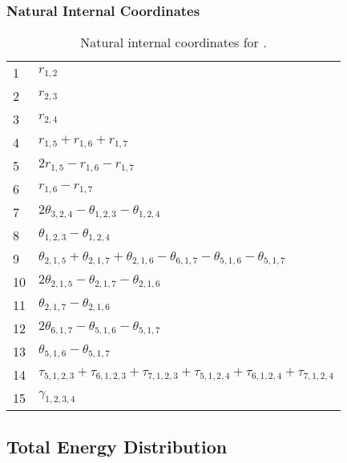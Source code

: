 \documentclass[10pt,oneside]{article}
\begin{document}
\begin{table}[h!]
\subsubsection*{Natural Internal Coordinates}
\centering
\caption{Natural internal coordinates for .}
\small
\begin{tabular}{ll}
\toprule
  1   & $r_{1,2}$ \\
  2   & $r_{2,3}$ \\
  3   & $r_{2,4}$ \\
  4   & $r_{1,5} + r_{1,6} + r_{1,7}$ \\
  5   & $2r_{1,5} - r_{1,6} - r_{1,7}$ \\
  6   & $r_{1,6} - r_{1,7}$ \\
  7   & $2\theta_{3,2,4} - \theta_{1,2,3} - \theta_{1,2,4}$ \\
  8   & $\theta_{1,2,3} - \theta_{1,2,4}$ \\
  9   & $\theta_{2,1,5} + \theta_{2,1,7} + \theta_{2,1,6} - \theta_{6,1,7} - \theta_{5,1,6} - \theta_{5,1,7}$ \\
  10  & $2\theta_{2,1,5} - \theta_{2,1,7} - \theta_{2,1,6}$ \\
  11  & $\theta_{2,1,7} - \theta_{2,1,6}$ \\
  12  & $2\theta_{6,1,7} - \theta_{5,1,6} - \theta_{5,1,7}$ \\
  13  & $\theta_{5,1,6} - \theta_{5,1,7}$ \\
  14  & $\tau_{5,1,2,3} + \tau_{6,1,2,3} + \tau_{7,1,2,3} + \tau_{5,1,2,4} + \tau_{6,1,2,4} + \tau_{7,1,2,4}$ \\
  15  & $\gamma_{1,2,3,4}$ \\
\bottomrule
\end{tabular}
\end{table}

\begin{table}
\subsection*{Total Energy Distribution}
\centering\end{table}

\clearpage

\subsection{}
\end{document}
